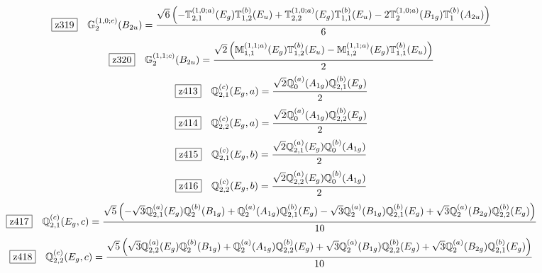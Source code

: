 \documentclass[fleqn,10pt,landscape]{jsarticle}
\begin{document}
\begin{dmath*}
\hspace*{3mm}\fbox{z319}\quad \mathbb{G}_{2}^{(1,0;c)}(B_{2u})=\frac{\sqrt{6} \left(- \mathbb{T}_{2,1}^{(1,0;a)}(E_{g}) \mathbb{T}_{1,2}^{(b)}(E_{u}) + \mathbb{T}_{2,2}^{(1,0;a)}(E_{g}) \mathbb{T}_{1,1}^{(b)}(E_{u}) - 2 \mathbb{T}_{2}^{(1,0;a)}(B_{1g}) \mathbb{T}_{1}^{(b)}(A_{2u})\right)}{6}
\end{dmath*}
\begin{dmath*}
\hspace*{3mm}\fbox{z320}\quad \mathbb{G}_{2}^{(1,1;c)}(B_{2u})=\frac{\sqrt{2} \left(\mathbb{M}_{1,1}^{(1,1;a)}(E_{g}) \mathbb{T}_{1,2}^{(b)}(E_{u}) - \mathbb{M}_{1,2}^{(1,1;a)}(E_{g}) \mathbb{T}_{1,1}^{(b)}(E_{u})\right)}{2}
\end{dmath*}
\begin{dmath*}
\hspace*{3mm}\fbox{z413}\quad \mathbb{Q}_{2,1}^{(c)}(E_{g},a)=\frac{\sqrt{2} \mathbb{Q}_{0}^{(a)}(A_{1g}) \mathbb{Q}_{2,1}^{(b)}(E_{g})}{2}
\end{dmath*}
\begin{dmath*}
\hspace*{3mm}\fbox{z414}\quad \mathbb{Q}_{2,2}^{(c)}(E_{g},a)=\frac{\sqrt{2} \mathbb{Q}_{0}^{(a)}(A_{1g}) \mathbb{Q}_{2,2}^{(b)}(E_{g})}{2}
\end{dmath*}
\begin{dmath*}
\hspace*{3mm}\fbox{z415}\quad \mathbb{Q}_{2,1}^{(c)}(E_{g},b)=\frac{\sqrt{2} \mathbb{Q}_{2,1}^{(a)}(E_{g}) \mathbb{Q}_{0}^{(b)}(A_{1g})}{2}
\end{dmath*}
\begin{dmath*}
\hspace*{3mm}\fbox{z416}\quad \mathbb{Q}_{2,2}^{(c)}(E_{g},b)=\frac{\sqrt{2} \mathbb{Q}_{2,2}^{(a)}(E_{g}) \mathbb{Q}_{0}^{(b)}(A_{1g})}{2}
\end{dmath*}
\begin{dmath*}
\hspace*{3mm}\fbox{z417}\quad \mathbb{Q}_{2,1}^{(c)}(E_{g},c)=\frac{\sqrt{5} \left(- \sqrt{3} \mathbb{Q}_{2,1}^{(a)}(E_{g}) \mathbb{Q}_{2}^{(b)}(B_{1g}) + \mathbb{Q}_{2}^{(a)}(A_{1g}) \mathbb{Q}_{2,1}^{(b)}(E_{g}) - \sqrt{3} \mathbb{Q}_{2}^{(a)}(B_{1g}) \mathbb{Q}_{2,1}^{(b)}(E_{g}) + \sqrt{3} \mathbb{Q}_{2}^{(a)}(B_{2g}) \mathbb{Q}_{2,2}^{(b)}(E_{g})\right)}{10}
\end{dmath*}
\begin{dmath*}
\hspace*{3mm}\fbox{z418}\quad \mathbb{Q}_{2,2}^{(c)}(E_{g},c)=\frac{\sqrt{5} \left(\sqrt{3} \mathbb{Q}_{2,2}^{(a)}(E_{g}) \mathbb{Q}_{2}^{(b)}(B_{1g}) + \mathbb{Q}_{2}^{(a)}(A_{1g}) \mathbb{Q}_{2,2}^{(b)}(E_{g}) + \sqrt{3} \mathbb{Q}_{2}^{(a)}(B_{1g}) \mathbb{Q}_{2,2}^{(b)}(E_{g}) + \sqrt{3} \mathbb{Q}_{2}^{(a)}(B_{2g}) \mathbb{Q}_{2,1}^{(b)}(E_{g})\right)}{10}
\end{dmath*}
\end{document}
